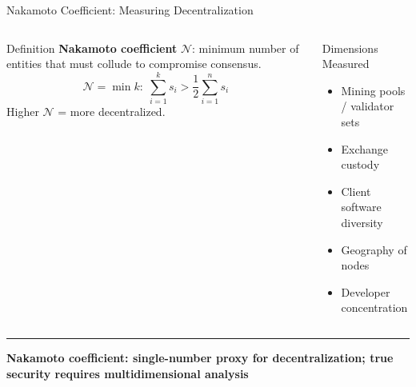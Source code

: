 \documentclass[8pt,aspectratio=169]{beamer}
\newcommand{\bottomnote}[1]{\vfill\vspace{-2mm}\textcolor{mllavender2}{\rule{\textwidth}{0.4pt}}\vspace{1mm}\footnotesize\textbf{#1}}
\begin{document}
\begin{frame}{Nakamoto Coefficient: Measuring Decentralization}
\begin{columns}
\begin{block}{Definition}
\textbf{Nakamoto coefficient} $\mathcal{N}$: minimum number of entities that must collude to compromise consensus.
\[\mathcal{N} = \min k:\;\sum_{i=1}^{k} s_i > \frac{1}{2}\sum_{i=1}^{n} s_i\]
Higher $\mathcal{N}$ = more decentralized.
\end{block}
\vspace{2mm}
\begin{block}{Dimensions Measured}
\begin{itemize}\small
  \item Mining pools / validator sets
  \item Exchange custody
  \item Client software diversity
  \item Geography of nodes
  \item Developer concentration
\end{itemize}
\end{block}
\end{columns}
\bottomnote{Nakamoto coefficient: single-number proxy for decentralization; true security requires multidimensional analysis}
\end{frame}
\end{document}
